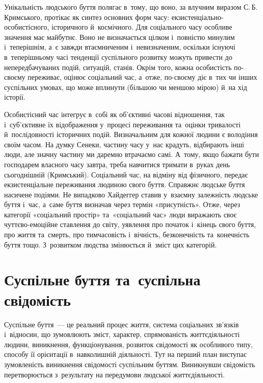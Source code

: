 \documentclass[a5paper,oneside,DIV=12,12pt,headings=small]{scrartcl}
\begin{document}
		Унікальність людського буття полягає в~тому, що воно, за влучним виразом С.\,Б.\,Кримського, протікає як синтез основних форм часу: екзистенціально-особистісного, історичного й~космічного. Для соціального часу особливе значення має майбутнє. Воно не визначається цілком і~повністю минулим і~теперішнім, а~є завжди втаємниченим і~невизначеним, оскільки існуючі в~теперішньому часі тенденції суспільного розвитку можуть привести до непередбачуваних подій, ситуацій, станів. Окрім того, кожна особистість по-своєму переживає, оцінює соціальний час, а~отже, по-своєму діє в~тих чи інших суспільних умовах, що може вплинути (більшою чи меншою мірою) й~на хід історії.

		Особистісний час інтегрує в~собі як об'\-єктивні часові відношення, так і~суб'\-єктивне їх відображення у~процесі переживання та~оцінки тривалості й~послідовності історичних подій. Визначальним для кожної людини є володіння своїм часом. На думку Сенеки, частину часу у~нас крадуть, відбирають інші люди, але значну частину ми даремно втрачаємо самі. А~тому, якщо бажати бути господарем власного часу завтра, треба навчитися тримати в~руках день сьогоднішній (Кримський). Соціальний час, на відміну від фізичного, передає екзистенціальне переживання людиною свого буття. Справжнє людське буття насичене подіями. Не випадково Хайдеггер ставив у~взаємну залежність людське буття і~час, а~саме буття визначав через термін «присутність». Отже, через категорії «соціальний простір» та~«соціальний час» люди виражають своє чуттєво-емоційне ставлення до світу, уявлення про початок і~кінець свого буття, про життя та~смерть, про тимчасовість і~вічність, безконечність та~конечність буття тощо. З~розвитком людства змінюється й~зміст цих категорій.
		 
	\section{Суспільне буття та~суспільна свідомість}
		Суспільне буття~— це реальний процес життя, система соціальних зв'язків і~відносин, що зумовлюють зміст, характер, спрямованість життєдіяльності людини, виникнення, функціонування, розвиток свідомості як особливого типу, способу її орієнтації в~навколишній діяльності. Тут на перший план виступає зумовленість виникнення свідомості суспільним буттям. Виникнувши свідомість перетворюється з~результату на передумови людської життєдіяльності.
		
\end{document}
